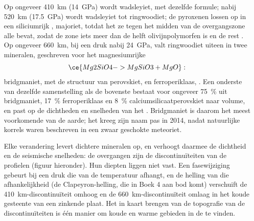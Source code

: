Op ongeveer \qty{410}{km} (\qty{14}{GPa}) wordt   wadsleyiet, met dezelfde formule; nabij \qty{520}{km} (\qty{17.5}{GPa}) wordt wadsleyiet tot
ringwoodiet; de pyroxenen lossen op in een siliciumrijk , majoriet, totdat het  ze tegen het midden van de overgangszone alle bevat, zodat de zone iets
meer dan de helft olivijnpolymorfen is en de rest . Op ongeveer \qty{660}{km}, bij een druk nabij \qty{24}{GPa}, valt ringwoodiet uiteen in
twee mineralen, geschreven voor het magnesiumrijke 
\[
  \ce{Mg2SiO4 -> MgSiO3 + MgO}:
\]
bridgmaniet,  met de structuur van perovskiet, en ferroperiklaas, . Een onderste  van dezelfde samenstelling als de
bovenste  bestaat voor ongeveer \qty{75}{\percent} uit bridgmaniet, \qty{17}{\percent} ferroperiklaas en \qty{8}{\percent} calciumsilicaatperovskiet
naar volume, en past op de dichtheden en snelheden van het . Bridgmaniet is daarom het meest voorkomende  van de aarde; het kreeg
zijn naam pas in 2014, nadat natuurlijke korrels waren beschreven in een zwaar geschokte meteoriet.

Elke verandering levert dichtere mineralen op, en verhoogt daarmee de dichtheid en de seismische snelheden: de overgangen zijn de discontinuïteiten van de
profielen (figuur hieronder). Hun diepten liggen niet vast. Een fasewijziging gebeurt bij een druk die van de temperatuur afhangt, en de helling van die
afhankelijkheid (de Clapeyron-helling, die in Boek 4 aan bod komt) verschuift de \qty{410}{km}-discontinuïteit omhoog en de
\qty{660}{km}-discontinuïteit omlaag in het koude gesteente van een zinkende plaat. Het in kaart brengen van de topografie van de discontinuïteiten is
één manier om koude en warme gebieden in de  te vinden.

